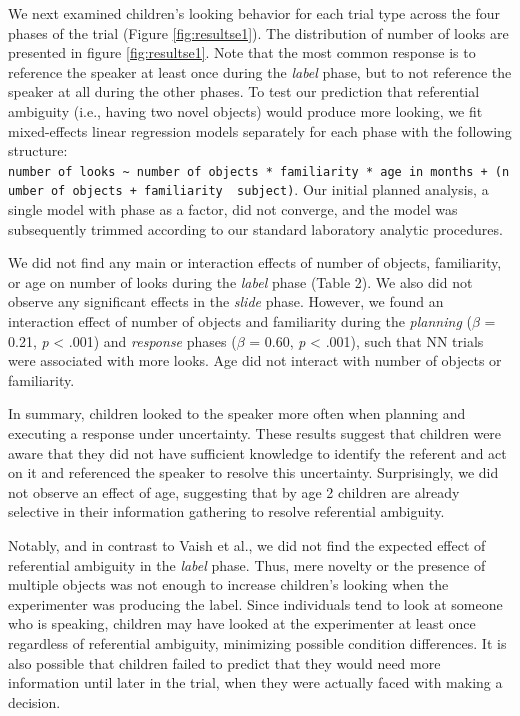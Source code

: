 \documentclass[english,,man]{apa6}
\begin{document}
We next examined children's looking behavior for each trial type across
the four phases of the trial (Figure \ref{fig:resultse1}). The
distribution of number of looks are presented in figure
\ref{fig:resultse1}. Note that the most common response is to reference
the speaker at least once during the \emph{label} phase, but to not
reference the speaker at all during the other phases. To test our
prediction that referential ambiguity (i.e., having two novel objects)
would produce more looking, we fit mixed-effects linear regression
models separately for each phase with the following structure:
\texttt{number\ of\ looks\ \textasciitilde{}\ number\ of\ objects\ *\ familiarity\ *\ age\ in\ months\ +\ (number\ of\ objects\ +\ familiarity\ \textbar{}\ subject)}.
Our initial planned analysis, a single model with phase as a factor, did
not converge, and the model was subsequently trimmed according to our
standard laboratory analytic procedures.

We did not find any main or interaction effects of number of objects,
familiarity, or age on number of looks during the \emph{label} phase
(Table 2). We also did not observe any significant effects in the
\emph{slide} phase. However, we found an interaction effect of number of
objects and familiarity during the \emph{planning} (\(\beta\) = 0.21,
\emph{p} \textless{} .001) and \emph{response} phases (\(\beta\) = 0.60,
\emph{p} \textless{} .001), such that NN trials were associated with
more looks. Age did not interact with number of objects or familiarity.

In summary, children looked to the speaker more often when planning and
executing a response under uncertainty. These results suggest that
children were aware that they did not have sufficient knowledge to
identify the referent and act on it and referenced the speaker to
resolve this uncertainty. Surprisingly, we did not observe an effect of
age, suggesting that by age 2 children are already selective in their
information gathering to resolve referential ambiguity.

Notably, and in contrast to Vaish et al., we did not find the expected
effect of referential ambiguity in the \emph{label} phase. Thus, mere
novelty or the presence of multiple objects was not enough to increase
children's looking when the experimenter was producing the label. Since
individuals tend to look at someone who is speaking, children may have
looked at the experimenter at least once regardless of referential
ambiguity, minimizing possible condition differences. It is also
possible that children failed to predict that they would need more
information until later in the trial, when they were actually faced with
making a decision.
\end{document}
